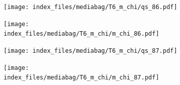 \documentclass[
  11pt,
  letterpaper,
]{scrreprt}
\begin{document}
\begin{figure}

\begin{minipage}{0.50\linewidth}

\begin{figure}[H]

{\centering \texttt{[image: index\_files/mediabag/T6\_m\_chi/qs\_86.pdf]}

}


\end{figure}%

\end{minipage}%
%
\begin{minipage}{0.50\linewidth}

\begin{figure}[H]

{\centering \texttt{[image: index\_files/mediabag/T6\_m\_chi/m\_chi\_86.pdf]}

}


\end{figure}%

\end{minipage}%

\end{figure}%

\begin{figure}

\begin{minipage}{0.50\linewidth}

\begin{figure}[H]

{\centering \texttt{[image: index\_files/mediabag/T6\_m\_chi/qs\_87.pdf]}

}


\end{figure}%

\end{minipage}%
%
\begin{minipage}{0.50\linewidth}

\begin{figure}[H]

{\centering \texttt{[image: index\_files/mediabag/T6\_m\_chi/m\_chi\_87.pdf]}

}


\end{figure}%

\end{minipage}%

\end{figure}%
\end{document}
